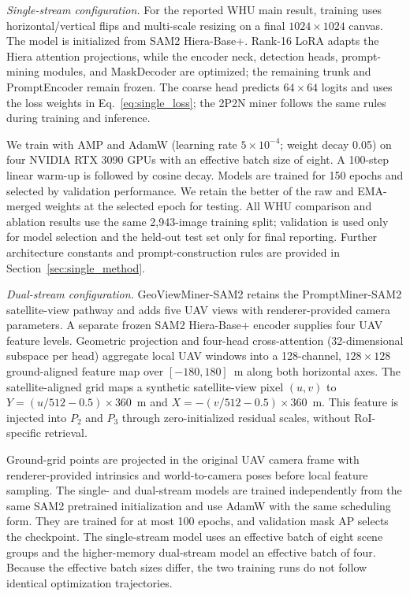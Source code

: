 \documentclass[letterpaper,journal]{IEEEtran}
\begin{document}
\noindent\textit{Single-stream configuration.}
For the reported WHU main result, training uses horizontal/vertical flips and multi-scale
resizing on a final $1024\times1024$ canvas. The model is initialized from SAM2 Hiera-Base+.
Rank-16 LoRA adapts the Hiera attention projections, while the encoder neck, detection heads,
prompt-mining modules, and MaskDecoder are optimized; the remaining trunk and PromptEncoder
remain frozen. The coarse head predicts $64\times64$ logits and uses the loss weights in
Eq.~\eqref{eq:single_loss}; the 2P2N miner follows the same rules during training and
inference.

We train with AMP and AdamW (learning rate $5\times10^{-4}$; weight decay 0.05) on four NVIDIA
RTX 3090 GPUs with an effective batch size of eight. A 100-step linear warm-up is followed by
cosine decay. Models are trained for 150 epochs and selected by validation performance. We
retain the better of the raw and EMA-merged weights at the selected epoch for testing. All WHU
comparison and ablation results use the same 2,943-image training split; validation is used
only for model selection and the held-out test set only for final reporting. Further
architecture constants and prompt-construction rules are provided in Section~\ref{sec:single_method}.

\noindent\textit{Dual-stream configuration.}
GeoViewMiner-SAM2 retains the PromptMiner-SAM2 satellite-view pathway and adds five UAV views with
renderer-provided camera parameters. A separate frozen SAM2 Hiera-Base+ encoder supplies four
UAV feature levels. Geometric projection and four-head cross-attention (32-dimensional subspace
per head) aggregate local UAV windows into a 128-channel, $128\times128$ ground-aligned feature
map over $[-180,180]$~m along both horizontal axes. The satellite-aligned grid maps a synthetic
satellite-view pixel $(u,v)$ to $Y=(u/512-0.5)\times360$~m and $X=-(v/512-0.5)\times360$~m. This
feature is injected into $P_2$ and $P_3$ through zero-initialized residual scales, without
RoI-specific retrieval.

Ground-grid points are projected in the original UAV camera frame with renderer-provided
intrinsics and world-to-camera poses before local feature sampling. The single- and dual-stream
models are trained independently from the same SAM2 pretrained initialization and use AdamW
with the same scheduling form. They are trained for at most 100 epochs, and validation mask AP
selects the checkpoint. The single-stream model uses an effective batch of eight scene groups
and the higher-memory dual-stream model an effective batch of four. Because the effective batch
sizes differ, the two training runs do not follow identical optimization trajectories.
\end{document}

